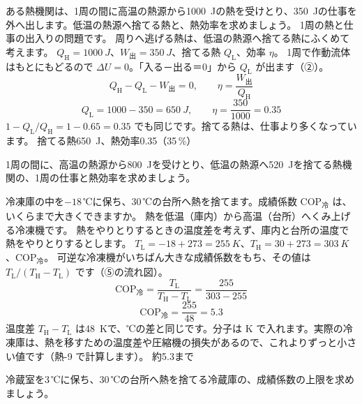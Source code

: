 \label{ph:熱-5:ex2}
\begin{phreidai}[熱機関の熱の出入り]
ある熱機関は、1周の間に高温の熱源から\qty{1000}{J}の熱を受けとり、\qty{350}{J}の仕事を外へ出します。低温の熱源へ捨てる熱と、熱効率を求めましょう。
\phbamen
1周の熱と仕事の出入りの問題です。
\phmushi
周りへ逃げる熱は、低温の熱源へ捨てる熱にふくめて考えます。
\phzu
$Q_{\mathrm H}=\qty{1000}{J}$、$W_{\text{出}}=\qty{350}{J}$、捨てる熱 $Q_{\mathrm L}$、効率 $\eta$。
\phriyu
1周で作動流体はもとにもどるので $\Delta U=0$。「入る－出る＝0」から $Q_{\mathrm L}$ が出ます（②）。
\phtateru
\[Q_{\mathrm H}-Q_{\mathrm L}-W_{\text{出}}=0,\qquad\eta=\frac{W_{\text{出}}}{Q_{\mathrm H}}\]
\phtoku
\[Q_{\mathrm L}=1000-350=\qty{650}{J},\qquad\eta=\frac{350}{1000}=0.35\]
\phtashikame
$1-Q_{\mathrm L}/Q_{\mathrm H}=1-0.65=0.35$ でも同じです。捨てる熱は、仕事より多くなっています。
\kotae 捨てる熱\qty{650}{J}、熱効率0.35（35\,\%）
\end{phreidai}
\begin{jibun}
1周の間に、高温の熱源から\qty{800}{J}を受けとり、低温の熱源へ\qty{520}{J}を捨てる熱機関の、1周の仕事と熱効率を求めましょう。
\end{jibun}

\label{ph:熱-5:ex3}
\begin{phreidai}[冷凍庫の成績係数の上限]
冷凍庫の中を$-18$\,℃に保ち、30\,℃の台所へ熱を捨てます。成績係数 $\mathrm{COP}_{\text{冷}}$ は、いくらまで大きくできますか。
\phbamen
熱を低温（庫内）から高温（台所）へくみ上げる冷凍機です。
\phmushi
熱をやりとりするときの温度差を考えず、庫内と台所の温度で熱をやりとりするとします。
\phzu
$T_{\mathrm L}=-18+273=\qty{255}{K}$、$T_{\mathrm H}=30+273=\qty{303}{K}$、$\mathrm{COP}_{\text{冷}}$。
\phriyu
可逆な冷凍機がいちばん大きな成績係数をもち、その値は $T_{\mathrm L}/(T_{\mathrm H}-T_{\mathrm L})$ です（⑤の流れ図）。
\phtateru
\[\mathrm{COP}_{\text{冷}}=\frac{T_{\mathrm L}}{T_{\mathrm H}-T_{\mathrm L}}=\frac{255}{303-255}\]
\phtoku
\[\mathrm{COP}_{\text{冷}}=\frac{255}{48}=5.3\]
\phtashikame
温度差 $T_{\mathrm H}-T_{\mathrm L}$ は\qty{48}{K}で、℃の差と同じです。分子は K で入れます。実際の冷凍庫は、熱を移すための温度差や圧縮機の損失があるので、これよりずっと小さい値です（熱-9 で計算します）。
\kotae 約5.3まで
\end{phreidai}
\begin{jibun}
冷蔵室を3\,℃に保ち、30\,℃の台所へ熱を捨てる冷蔵庫の、成績係数の上限を求めましょう。
\end{jibun}

